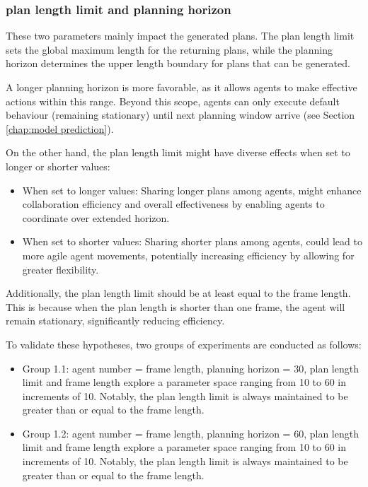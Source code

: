 \subsubsection{plan length limit and planning horizon}

These two parameters mainly impact the generated plans. The plan length limit sets the global maximum length for the returning plans, while the planning horizon determines the upper length boundary for plans that can be generated.

A longer planning horizon is more favorable, as it allows agents to make effective actions within this range. Beyond this scope, agents can only execute default behaviour (remaining stationary) until next planning window arrive (see Section \ref{chap:model prediction}).

On the other hand, the plan length limit might have diverse effects when set to longer or shorter values:
\begin{itemize}
    \item When set to longer values: Sharing longer plans among agents, might enhance collaboration efficiency and overall effectiveness by enabling agents to coordinate over extended horizon.
    \item When set to shorter values: Sharing shorter plans among agents, could lead to more agile agent movements, potentially increasing efficiency by allowing for greater flexibility.
\end{itemize}

Additionally, the plan length limit should be at least equal to the frame length. This is because when the plan length is shorter than one frame, the agent will remain stationary, significantly reducing efficiency.

To validate these hypotheses, two groups of experiments are conducted as follows:
\begin{itemize}
    \item Group 1.1: agent number = frame length, planning horizon = 30, plan length limit and frame length explore a parameter space ranging from 10 to 60 in increments of 10. Notably, the plan length limit is always maintained to be greater than or equal to the frame length.
    \item Group 1.2: agent number = frame length, planning horizon = 60, plan length limit and frame length explore a parameter space ranging from 10 to 60 in increments of 10. Notably, the plan length limit is always maintained to be greater than or equal to the frame length.
\end{itemize}


